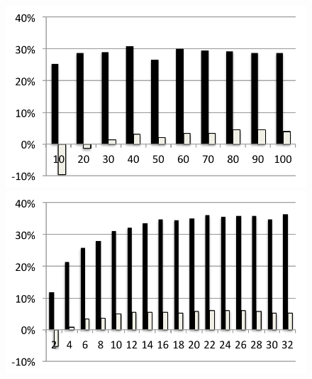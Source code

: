 \newcommand\mywidth{0.5 \textwidth}
\begin{figure}
  \includegraphics[width=\mywidth]{../../eval/32threads/case1it.pdf}\includegraphics[width=\mywidth]{../../eval/32threads/case1th.pdf}


\end{figure}

